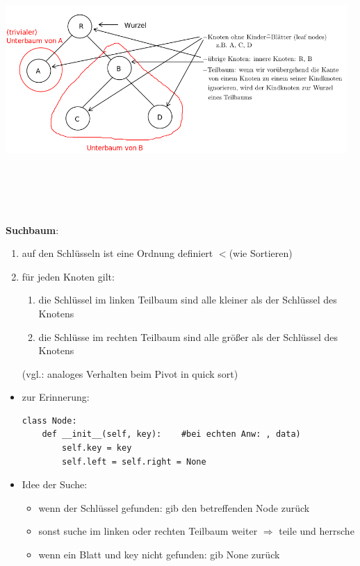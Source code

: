 \includegraphics[width=13cm,height=10cm,keepaspectratio]{./Pictures/binaerBaum2.png}

\textbf{Suchbaum}:
\begin{enumerate}
    \item auf den Schlüsseln ist eine Ordnung definiert \glqq $<$\grqq (wie Sortieren)
    \item für jeden Knoten gilt:
    \begin{enumerate}[label=\alph*)]
        \item die Schlüssel im linken Teilbaum sind alle kleiner als der Schlüssel des Knotens
        \item die Schlüsse im rechten Teilbaum sind alle größer als der Schlüssel des Knotens
    \end{enumerate}
    (vgl.: analoges Verhalten beim Pivot in quick sort)
\end{enumerate}
\begin{itemize}
    \item zur Erinnerung: \\
    \begin{verbatim}
class Node:
    def __init__(self, key):    #bei echten Anw: , data)
        self.key = key
        self.left = self.right = None
    \end{verbatim}
    \item Idee der Suche:
    \begin{itemize}
        \item wenn der Schlüssel gefunden: gib den betreffenden Node zurück
        \item sonst suche im linken oder rechten Teilbaum weiter $\Rightarrow$ \glqq teile und herrsche\grqq
        \item wenn ein Blatt und key nicht gefunden: gib None zurück
    \end{itemize}
\end{itemize}


